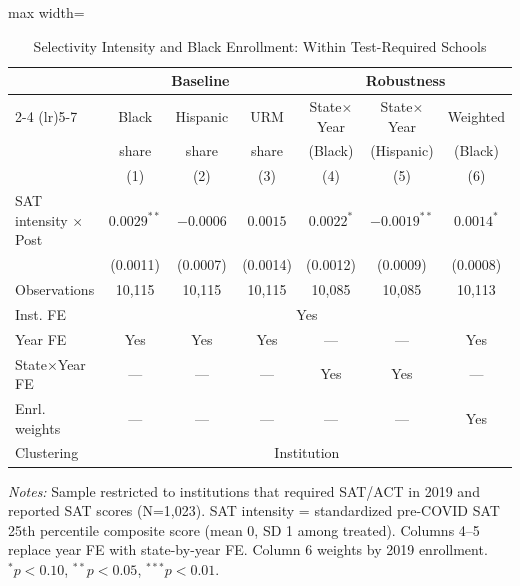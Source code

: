 \begin{table}[htbp]
\centering
\caption{Selectivity Intensity and Black Enrollment: Within Test-Required Schools}
\label{tab:intensity}
\begin{adjustbox}{max width=\textwidth}
\begin{tabular}{lcccccc}
\hline\hline
 & \multicolumn{3}{c}{Baseline} & \multicolumn{3}{c}{Robustness} \\
\cmidrule(lr){2-4} \cmidrule(lr){5-7}
 & Black & Hispanic & URM & State$\times$Year & State$\times$Year & Weighted \\
 & share & share & share & (Black) & (Hispanic) & (Black) \\
 & (1) & (2) & (3) & (4) & (5) & (6) \\
\hline
SAT intensity $\times$ Post & $0.0029^{**}$ & $-0.0006$ & $0.0015$ & $0.0022^{*}$ & $-0.0019^{**}$ & $0.0014^{*}$ \\
 & (0.0011) & (0.0007) & (0.0014) & (0.0012) & (0.0009) & (0.0008) \\
\hline
Observations & 10,115 & 10,115 & 10,115 & 10,085 & 10,085 & 10,113 \\
Inst. FE & \multicolumn{6}{c}{Yes} \\
Year FE & Yes & Yes & Yes & --- & --- & Yes \\
State$\times$Year FE & --- & --- & --- & Yes & Yes & --- \\
Enrl. weights & --- & --- & --- & --- & --- & Yes \\
Clustering & \multicolumn{6}{c}{Institution} \\
\hline\hline
\end{tabular}
\end{adjustbox}
\begin{tablenotes}[flushleft]
\small
\item \textit{Notes:} Sample restricted to institutions that required SAT/ACT in 2019 and reported SAT scores (N=1,023). SAT intensity = standardized pre-COVID SAT 25th percentile composite score (mean 0, SD 1 among treated). Columns 4--5 replace year FE with state-by-year FE. Column 6 weights by 2019 enrollment. $^{*} p<0.10$, $^{**} p<0.05$, $^{***} p<0.01$.
\end{tablenotes}
\end{table}
